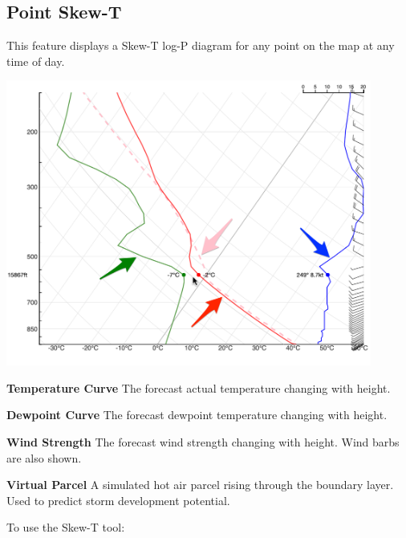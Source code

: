 \documentclass[11pt,a4paper]{article}
\begin{document}
\subsection{Point Skew-T}
This feature displays a Skew-T log-P diagram for any point on the map at any time of day.
\begin{center}
\includegraphics[width=12cm]{images/skew-t.png}
\end{center}
\begin{arrow_red}
\item \textbf{Temperature Curve} The forecast actual temperature changing with height.
\end{arrow_red}
\begin{arrow_green}
\item \textbf{Dewpoint Curve} The forecast dewpoint temperature changing with height.
\end{arrow_green}
\begin{arrow_blue}
\item \textbf{Wind Strength} The forecast wind strength changing with height. Wind barbs are also shown.
\end{arrow_blue}
\begin{arrow_pink}
\item \textbf{Virtual Parcel} A simulated hot air parcel rising through the boundary layer. Used to predict storm development potential.
\end{arrow_pink}
To use the Skew-T tool:
\end{document}
